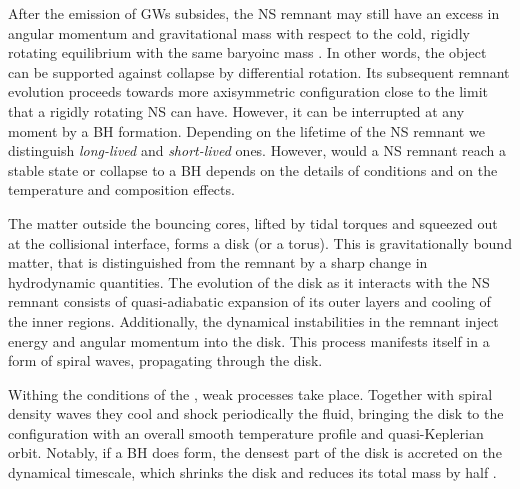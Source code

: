 After the emission of \acp{GW} subsides, the \ac{NS} remnant may still have an excess 
in angular momentum and gravitational mass with respect to the cold, 
rigidly rotating equilibrium with the same baryoinc mass \citep{Radice:2018xqa}. 
In other words, the object can be supported against collapse by differential rotation.
%
Its subsequent remnant evolution proceeds towards more axisymmetric configuration 
close to the limit that a rigidly rotating \ac{NS} can have.  
However, it can be interrupted at any moment by a \ac{BH} formation. %
Depending on the lifetime of the \ac{NS} remnant we distinguish \textit{long-lived}
and \textit{short-lived} ones. 
However, would a \ac{NS} remnant reach a stable state 
or collapse to a \ac{BH} depends on the 
details of \pmerg{} conditions and on the temperature and composition effects.


The matter outside the bouncing cores, lifted by tidal torques and squeezed out at the 
collisional interface, forms a disk (or a torus). 
%
This is gravitationally bound matter, that is distinguished from the remnant by 
a sharp change in hydrodynamic quantities.
%
The evolution of the disk as it interacts with the \ac{NS} remnant consists of 
quasi-adiabatic expansion of its outer layers 
and cooling of the inner regions. 
%
Additionally, the dynamical instabilities in the remnant inject energy and 
angular momentum into the disk. This process manifests itself in a form of spiral waves, 
propagating through the disk. 


Withing the conditions of the \pmerg{}, weak processes take place. 
Together with spiral density waves they cool and shock periodically the 
fluid, bringing the disk to the configuration with an overall smooth 
temperature profile 
and quasi-Keplerian orbit.
%
Notably, if a \ac{BH} does form, the densest part of the disk is 
accreted on the dynamical timescale, which shrinks the disk and reduces its total mass by half 
\citep{Perego:2019adq}.


